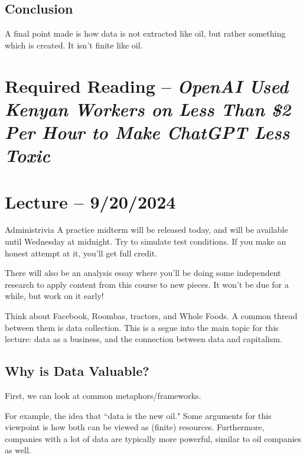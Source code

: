 \documentclass[openany]{book}
\begin{document}
\subsection{Conclusion}
A final point made is how data is not extracted like oil, but rather something which is created. It isn't finite like oil.

\section{Required Reading -- \textit{OpenAI Used Kenyan Workers on Less Than \$2 Per Hour to Make ChatGPT Less Toxic}}


\section{Lecture -- 9/20/2024}

\begin{miscbox}{Administrivia}
	A practice midterm will be released today, and will be available until Wednesday at midnight. Try to simulate test conditions. If you make an honest attempt at it, you'll get full credit.
	
	There will also be an analysis essay where you'll be doing some independent research to apply content from this course to new pieces. It won't be due for a while, but work on it early! 
\end{miscbox}

\begin{example}
	Think about Facebook, Roombas, tractors, and Whole Foods. A common thread between them is data collection. This is a segue into the main topic for this lecture: data as a business, and the connection between data and capitalism.
\end{example}

\subsection{Why is Data Valuable?}
First, we can look at common metaphors/frameworks.

\begin{example}
	For example, the idea that ``data is the new oil." Some arguments for this viewpoint is how both can be viewed as (finite) resources. Furthermore, companies with a lot of data are typically more powerful, similar to oil companies as well.
\end{example}
\end{document}
